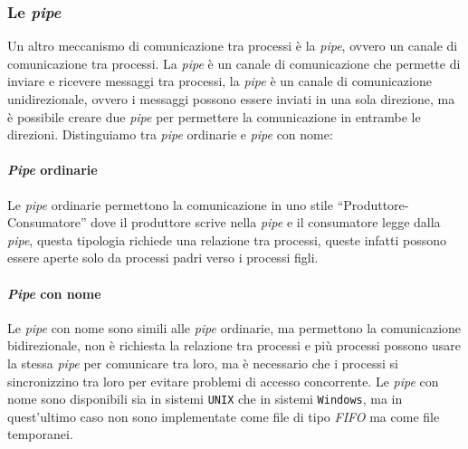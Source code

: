     \subsubsection{Le \textit{pipe}}
        Un altro meccanismo di comunicazione tra processi è la \textit{pipe}, ovvero un canale di comunicazione tra processi. \newline
        La \textit{pipe} è un canale di comunicazione che permette di inviare e ricevere messaggi tra processi, la \textit{pipe} è un canale di comunicazione unidirezionale, ovvero i messaggi possono essere inviati in una sola direzione, ma è possibile creare due \textit{pipe} per permettere la comunicazione in entrambe le direzioni. Distinguiamo tra \textit{pipe} ordinarie e \textit{pipe} con nome:
        \paragraph{\textit{Pipe} ordinarie} Le \textit{pipe} ordinarie permettono la comunicazione in uno stile ``Produttore-Consumatore'' dove il produttore scrive nella \textit{pipe} e il consumatore legge dalla \textit{pipe}, questa tipologia richiede una relazione tra processi, queste infatti possono essere aperte solo da processi padri verso i processi figli.
        \paragraph{\textit{Pipe} con nome} Le \textit{pipe} con nome sono simili alle \textit{pipe} ordinarie, ma permettono la comunicazione bidirezionale, non è richiesta la relazione tra processi e più processi possono usare la stessa \textit{pipe} per comunicare tra loro, ma è necessario che i processi si sincronizzino tra loro per evitare problemi di accesso concorrente. Le \textit{pipe} con nome sono disponibili sia in sistemi \texttt{UNIX} che in sistemi \texttt{Windows}, ma in quest'ultimo caso non sono implementate come file di tipo \textit{FIFO} ma come file temporanei.